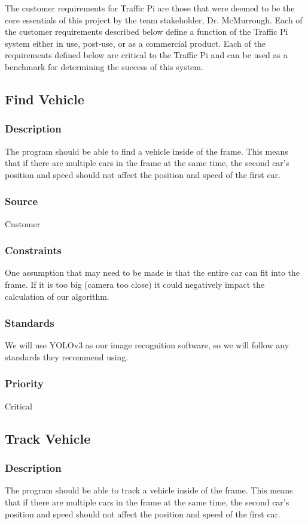 The customer requirements for Traffic Pi are those that were deemed to be the core essentials of this project by the team stakeholder, Dr. McMurrough. Each of the customer requirements described below define a function of the Traffic Pi system either in use, post-use, or as a commercial product. Each of the requirements defined below are critical to the Traffic Pi and can be used as a benchmark for determining the success of this system.

\subsection{Find Vehicle}
\subsubsection{Description}
The program should be able to find a vehicle inside of the frame. This means that if there are multiple cars in the frame at the same time, the second car's position and speed should not affect the position and speed of the first car. 
\subsubsection{Source}
Customer
\subsubsection{Constraints}
One assumption that may need to be made is that the entire car can fit into the frame. If it is too big (camera too close) it could negatively impact the calculation of our algorithm. 
\subsubsection{Standards}
We will use YOLOv3 as our image recognition software, so we will follow any standards they recommend using.
\subsubsection{Priority}
Critical

\subsection{Track Vehicle}
\subsubsection{Description}
The program should be able to track a vehicle inside of the frame. This means that if there are multiple cars in the frame at the same time, the second car's position and speed should not affect the position and speed of the first car. 
